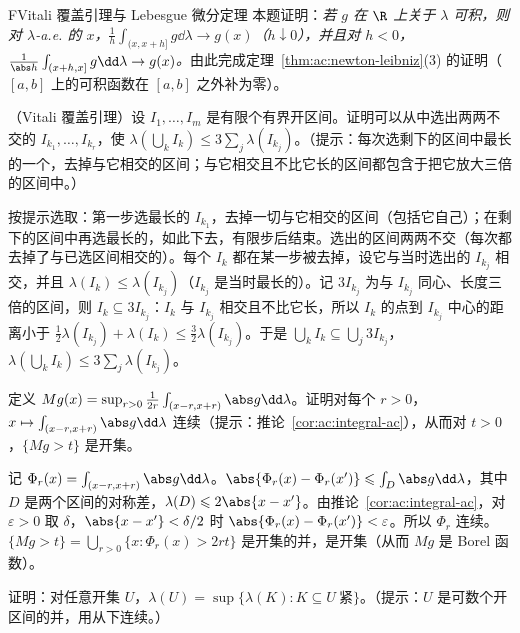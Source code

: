 
\begin{probleme}{F}{Vitali 覆盖引理与 Lebesgue 微分定理}
本题证明：\emph{若 $g$ 在 $\R$ 上关于 $\lambda$ 可积，则对 $\lambda$-a.e. 的 $x$，$\frac1h\int_{(x,x+h]}g\dd\lambda\to g(x)$（$h\downarrow0$），并且对 $h<0$，$\frac1{\abs h}\int_{(x+h,x]}g\dd\lambda\to g(x)$。}由此完成定理~\ref{thm:ac:newton-leibniz}(3) 的证明（$[a,b]$ 上的可积函数在 $[a,b]$ 之外补为零）。
\begin{questions}
\item （Vitali 覆盖引理）设 $I_1,\dots,I_m$ 是有限个有界开区间。证明可以从中选出两两不交的 $I_{k_1},\dots,I_{k_r}$，使 $\lambda(\bigcup_kI_k)\leqslant3\sum_j\lambda(I_{k_j})$。（提示：每次选剩下的区间中最长的一个，去掉与它相交的区间；与它相交且不比它长的区间都包含于把它放大三倍的区间中。）
\begin{solution}
按提示选取：第一步选最长的 $I_{k_1}$，去掉一切与它相交的区间（包括它自己）；在剩下的区间中再选最长的，如此下去，有限步后结束。选出的区间两两不交（每次都去掉了与已选区间相交的）。每个 $I_k$ 都在某一步被去掉，设它与当时选出的 $I_{k_j}$ 相交，并且 $\lambda(I_k)\leqslant\lambda(I_{k_j})$（$I_{k_j}$ 是当时最长的）。记 $3I_{k_j}$ 为与 $I_{k_j}$ 同心、长度三倍的区间，则 $I_k\subseteq3I_{k_j}$：$I_k$ 与 $I_{k_j}$ 相交且不比它长，所以 $I_k$ 的点到 $I_{k_j}$ 中心的距离小于 $\frac12\lambda(I_{k_j})+\lambda(I_k)\leqslant\frac32\lambda(I_{k_j})$。于是 $\bigcup_kI_k\subseteq\bigcup_j3I_{k_j}$，$\lambda(\bigcup_kI_k)\leqslant3\sum_j\lambda(I_{k_j})$。
\end{solution}
\item 定义 $Mg(x)=\sup_{r>0}\frac1{2r}\int_{(x-r,x+r)}\abs g\dd\lambda$。证明对每个 $r>0$，$x\mapsto\int_{(x-r,x+r)}\abs g\dd\lambda$ 连续（提示：推论~\ref{cor:ac:integral-ac}），从而对 $t>0$，$\{Mg>t\}$ 是开集。
\begin{solution}
记 $\Phi_r(x)=\int_{(x-r,x+r)}\abs g\dd\lambda$。$\abs{\Phi_r(x)-\Phi_r(x')}\leqslant\int_{D}\abs g\dd\lambda$，其中 $D$ 是两个区间的对称差，$\lambda(D)\leqslant2\abs{x-x'}$。由推论~\ref{cor:ac:integral-ac}，对 $\varepsilon>0$ 取 $\delta$，$\abs{x-x'}<\delta/2$ 时 $\abs{\Phi_r(x)-\Phi_r(x')}<\varepsilon$。所以 $\Phi_r$ 连续。$\{Mg>t\}=\bigcup_{r>0}\{x:\Phi_r(x)>2rt\}$ 是开集的并，是开集（从而 $Mg$ 是 Borel 函数）。
\end{solution}
\item 证明：对任意开集 $U$，$\lambda(U)=\sup\{\lambda(K):K\subseteq U\ \text{紧}\}$。（提示：$U$ 是可数个开区间的并，用从下连续。）

\end{questions}
\end{probleme}
